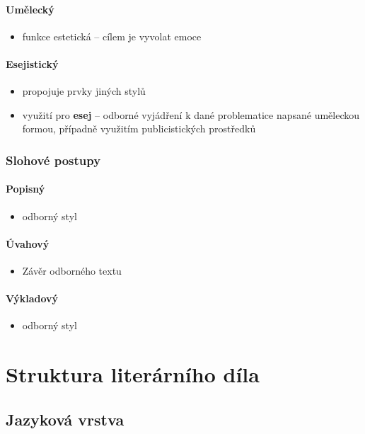 \documentclass[10pt,a4paper]{article}
\begin{document}
\paragraph{Umělecký}
\begin{itemize}
\item funkce estetická -- cílem je vyvolat emoce
\end{itemize}

\paragraph{Esejistický}
\begin{itemize}
\item propojuje prvky jiných stylů
\item využití pro \textbf{esej} -- odborné vyjádření k dané problematice napsané uměleckou formou, případně využitím publicistických prostředků
\end{itemize}

\subsubsection{Slohové postupy}
\paragraph{Popisný}
\begin{itemize}
\item odborný styl
\end{itemize}

\paragraph{Úvahový}
\begin{itemize}
\item Závěr odborného textu
\end{itemize}

\paragraph{Výkladový}
\begin{itemize}
\item odborný styl
\end{itemize}

\newpage
\section{Struktura literárního díla}
\subsection{Jazyková vrstva}
\end{document}

